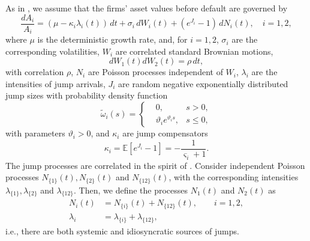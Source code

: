 As in \cite{Lipton2015}, we assume that the firms' asset values before default are governed by
\begin{equation}
	\label{assets_dynamics}
	\frac{d A_i}{A_i} = (\mu - \kappa_i \lambda_i(t)) \, d t + \sigma_i\, d W_i(t) + (e^{J_i} - 1) \, d N_i(t), \quad i = 1, 2,
\end{equation}
where $\mu$ is the deterministic growth rate, and, for $i=1,2$, $\sigma_i$ are the corresponding volatilities, $W_i$ are correlated standard Brownian motions,
\begin{equation}
	d W_1(t) d W_2(t) = \rho \, d t, 
\end{equation}
with correlation $\rho$, $N_i$ are Poisson processes independent of $W_i$, $\lambda_i$ are the intensities of jump arrivals, $J_i$ are random negative exponentially distributed jump sizes with probability density function
\begin{equation}
	\tilde{\omega}_i(s) = \left\{
	\begin{aligned}
		& 0, & s > 0, \\
		& \vartheta_i e^{\vartheta_i s}, & s \le 0,
	\end{aligned}
	\right.
\end{equation} 
with parameters $\vartheta_i > 0$, and $\kappa_i$ are jump compensators
\begin{equation}
	\kappa_i = \mathbb{E} [e^{J_i} - 1] = -\frac{1}{\varsigma_i + 1}.
\end{equation}
The jump processes are correlated in the spirit of \cite{MarshallOlkin}. Consider independent Poisson processes $N_{\{1\}}(t), N_{\{2\}}(t)$ and $N_{\{12\}}(t)$, with the corresponding intensities $\lambda_{\{1\}}, \lambda_{\{2\}}$ and $\lambda_{\{12\}}$. Then, we define the processes $N_1(t)$ and $N_2(t)$ as
\begin{equation}
	\begin{aligned}
		N_i(t) &= N_{\{i\}}(t) + N_{\{12\}}(t), \qquad i=1,2,\\
		\lambda_i &= \lambda_{\{i\}} + \lambda_{\{12\}},
	\end{aligned}
\end{equation} 
i.e., there are both systemic and idiosyncratic sources of jumps.

